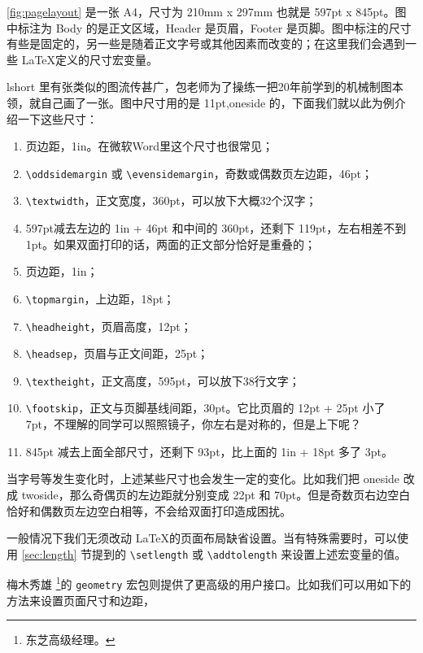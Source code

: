 \autoref{fig:pagelayout} 是一张 A4，尺寸为 210mm x 297mm 也就是 597pt x 845pt。图中标注为 Body 的是正文区域，Header 是页眉，Footer 是页脚。图中标注的尺寸有些是固定的，另一些是随着正文字号或其他因素而改变的；在这里我们会遇到一些 \LaTeX 定义的尺寸宏变量。

lshort 里有张类似的图流传甚广，包老师为了操练一把20年前学到的机械制图本领，就自己画了一张。图中尺寸用的是 11pt,oneside 的，下面我们就以此为例介绍一下这些尺寸：

\begin{enumerate}
  \item 页边距，1in。在微软Word里这个尺寸也很常见；
  \item \verb|\oddsidemargin| 或 \verb|\evensidemargin|，奇数或偶数页左边距，46pt；
  \item \verb|\textwidth|，正文宽度，360pt，可以放下大概32个汉字；
  \item 597pt减去左边的 1in + 46pt 和中间的 360pt，还剩下 119pt，左右相差不到 1pt。如果双面打印的话，两面的正文部分恰好是重叠的；
  \item 页边距，1in；
  \item \verb|\topmargin|，上边距，18pt；
  \item \verb|\headheight|，页眉高度，12pt；
  \item \verb|\headsep|，页眉与正文间距，25pt；
  \item \verb|\textheight|，正文高度，595pt，可以放下38行文字；
  \item \verb|\footskip|，正文与页脚基线间距，30pt。它比页眉的 12pt + 25pt 小了 7pt，不理解的同学可以照照镜子，你左右是对称的，但是上下呢？
  \item 845pt 减去上面全部尺寸，还剩下 93pt，比上面的 1in + 18pt 多了 3pt。
\end{enumerate}

当字号等发生变化时，上述某些尺寸也会发生一定的变化。比如我们把 oneside 改成 twoside，那么奇偶页的左边距就分别变成 22pt 和 70pt。但是奇数页右边空白恰好和偶数页左边空白相等，不会给双面打印造成困扰。

一般情况下我们无须改动 \LaTeX 的页面布局缺省设置。当有特殊需要时，可以使用 \ref{sec:length} 节提到的 \verb|\setlength| 或 \verb|\addtolength| 来设置上述宏变量的值。

梅木秀雄\indexUmeki{} \footnote{东芝高级经理。}的 \texttt{geometry} 宏包\citep{Umeki_geometry}则提供了更高级的用户接口。比如我们可以用如下的方法来设置页面尺寸和边距，

\begin{Code}[]
\usepackage[paperwidth=100mm, paperheight=150mm, margin=20mm]{geometry}
\end{Code}

